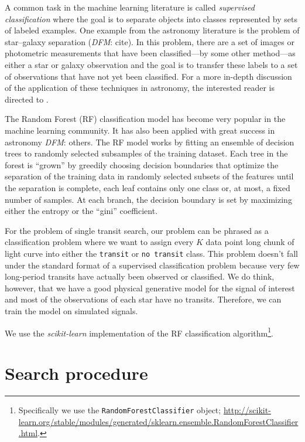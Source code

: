 \documentclass[12pt,preprint]{aastex}
\newcommand{\project}[1]{\textsl{#1}}
\newcommand{\sectlabel}[1]{\label{sect:#1}}
\newcommand{\todo}[3]{{\color{#2}\emph{#1}: #3}}
\newcommand{\dfmtodo}[1]{\todo{DFM}{red}{#1}}
\begin{document}
A common task in the machine learning literature is called \emph{supervised
classification} where the goal is to separate objects into classes
represented by sets of labeled examples.
One example from the astronomy literature is the problem of star--galaxy
separation (\dfmtodo{cite}).
In this problem, there are a set of images or photometric measurements that
have been classified---by some other method---as either a star or galaxy
observation and the goal is to transfer these labels to a set of observations
that have not yet been classified.
For a more in-depth discussion of the application of these techniques in
astronomy, the interested reader is directed to \citet{Ivezic:2013}.

The Random Forest (RF) classification model \citep{Breiman:2001} has become
very popular in the machine learning community.
It has also been applied with great success in astronomy \citep[for
example]{Richards:2011, Richards:2012} \dfmtodo{others}.
The RF model works by fitting an ensemble of decision trees to randomly
selected subsamples of the training dataset.
Each tree in the forest is ``grown'' by greedily choosing decision boundaries
that optimize the separation of the training data in randomly selected
subsets of the features until the separation is complete, each leaf contains
only one class or, at most, a fixed number of samples.
At each branch, the decision boundary is set by maximizing either the entropy
or the ``gini'' coefficient.

For the problem of single transit search, our problem can be phrased as a
classification problem where we want to assign every $K$ data point long chunk
of light curve into either the \texttt{transit} or \texttt{no transit} class.
This problem doesn't fall under the standard format of a supervised
classification problem because very few long-period transits have actually
been observed or classified.
We do think, however, that we have a good physical generative model for the
signal of interest and most of the observations of each star have no transits.
Therefore, we can train the model on simulated signals.

We use the \project{scikit-learn}\citep{Pedregosa:2011} implementation of the
RF classification algorithm\footnote{Specifically we use the
\texttt{RandomForestClassifier} object;
\url{http://scikit-learn.org/stable/modules/generated/sklearn.ensemble.RandomForestClassifier.html}.}.


\section{Search procedure}\sectlabel{search}
\end{document}
